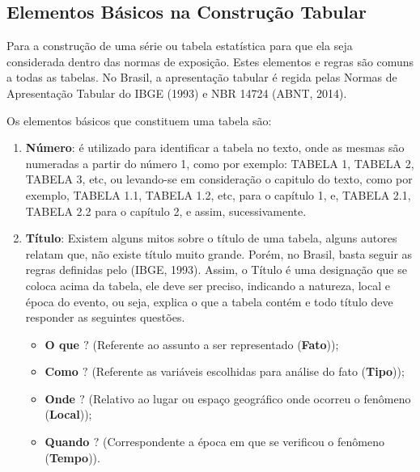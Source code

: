 \subsection{Elementos  Básicos na Construção Tabular}

\inic Para a construção de uma série ou tabela estatística para que ela seja considerada dentro das normas de exposição. Estes elementos e regras são comuns a todas as tabelas. No Brasil, a apresentação tabular é regida pelas Normas de Apresentação Tabular do IBGE (1993) e NBR 14724 (ABNT, 2014).\vskip0.3cm


Os elementos básicos que constituem uma tabela são:

\begin{enumerate}
  \item \textbf{Número}: é utilizado para identificar a tabela no texto, onde as mesmas são numeradas a partir do número 1, como por exemplo: TABELA 1, TABELA 2, TABELA 3, etc, ou levando-se em consideração o capitulo do texto, como por exemplo, TABELA 1.1, TABELA 1.2, etc, para o capítulo 1, e, TABELA 2.1, TABELA 2.2 para o capítulo 2, e assim, sucessivamente.
  \item \textbf{Título}: Existem alguns mitos sobre o título de uma tabela, alguns autores relatam que, não existe título muito grande. Porém, no Brasil, basta seguir as regras definidas pelo (IBGE, 1993). Assim, o Título é uma designação que se coloca acima da tabela, ele deve ser preciso,
  indicando a natureza, local e época do evento, ou seja, explica o que a tabela contém e todo título deve responder as seguintes questões.

\begin{itemize}
  \item \textbf{O que $?$}  (Referente ao assunto a ser representado (\textbf{Fato}));
  \item \textbf{Como $?$}  (Referente as variáveis escolhidas para análise do fato (\textbf{Tipo}));
   \item \textbf{Onde $?$}   (Relativo ao lugar ou espaço geográfico onde ocorreu o fenômeno (\textbf{Local}));
    \item \textbf{Quando $?$} (Correspondente a época em que se verificou o fenômeno (\textbf{Tempo})).
\end{itemize}


\end{enumerate}
